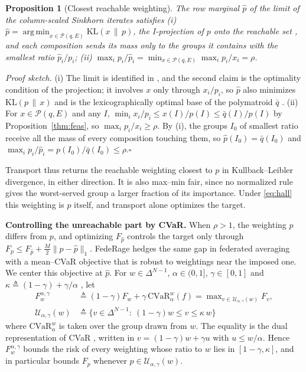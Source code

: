 \documentclass{article}
\newtheorem{proposition}[theorem]{Proposition}
\theoremstyle{definition}
\newcommand{\simplex}[1]{\Delta^{#1-1}}
\newcommand{\CVaR}{\mathrm{CVaR}}
\newcommand{\KL}{\mathrm{KL}}
\newcommand{\Reach}{\mathcal{P}(q,E)}
\newcommand{\Uset}{\mathcal{U}_{\alpha,\gamma}}
\DeclareMathOperator*{\argmin}{arg\,min}
\begin{document}
\vspace{-8pt}
\begin{proposition}[Closest reachable weighting]
\label{prop:proj}
The row marginal $\hat p$ of the limit of the column-scaled Sinkhorn
iterates satisfies
(i) $\hat p=\argmin_{x\in\Reach}\KL(x\,\|\,p)$, the I-projection of $p$
onto the reachable set \cite{csiszar1975}, and each composition sends its
mass only to the groups it contains with the smallest ratio $\hat p_i/p_i$;
(ii) $\max_ip_i/\hat p_i=\min_{x\in\Reach}\max_ip_i/x_i=\rho$.
\end{proposition}
\vspace{-8pt}
\noindent\emph{Proof sketch.} (i) The limit is identified in
\cite{gietl2013ipfp}, 
and the second claim is the optimality condition of the projection; it
involves $x$ only through $x_i/p_i$, so $\hat p$ also minimizes
$\KL(p\,\|\,x)$ and is the lexicographically optimal base of the
polymatroid $\bar q$ \cite{fujishige1980}. (ii) For $x\in\Reach$ and any
$I$, $\min_ix_i/p_i\le x(I)/p(I)\le\bar q(I)/p(I)$ by
Proposition~\ref{thm:feas}, so $\max_ip_i/x_i\ge\rho$. By (i), the groups
$I_0$ of smallest ratio receive all the mass of every composition
touching them, so $\hat p(I_0)=\bar q(I_0)$ and
$\max_ip_i/\hat p_i=p(I_0)/\bar q(I_0)\le\rho$.\hfill$\square$

Transport thus returns the reachable weighting closest to $p$ in
Kullback--Leibler divergence, in either direction. It is also max--min
fair, since no normalized rule gives the worst-served group a larger
fraction of its importance. Under \eqref{eq:hall} this weighting is $p$
itself, and transport alone optimizes the target.

\noindent\textbf{Controlling the unreachable part by CVaR.} When $\rho>1$,
the weighting $\hat p$ differs from $p$, and optimizing $F_{\hat p}$
controls the target only through
$F_p\le F_{\hat p}+\frac M2\|p-\hat p\|_1$. \textsf{FedeRage}
\cite{rahimi2026federage} hedges the same gap in federated averaging with
a mean--CVaR objective that is robust to weightings near the imposed one.
We center this objective at $\hat p$. For $w\in\simplex{N}$,
$\alpha\in(0,1]$, $\gamma\in[0,1]$ and
$\kappa\triangleq(1-\gamma)+\gamma/\alpha$ \cite{rahimi2026federage}, let
\vspace{-8pt}
\begin{equation}
\begin{aligned}
\label{eq:meancvar}
F^{\alpha,\gamma}_w&\triangleq(1-\gamma)F_w+\gamma\,\CVaR^w_\alpha(f)
=\max\nolimits_{v\in\,\Uset(w)}F_v,\\
\Uset(w)&\triangleq\big\{v\in\simplex{N}:\ (1-\gamma)w\le v\le\kappa\,w\big\}
\end{aligned}
\end{equation}
where $\CVaR^w_\alpha$ is taken over the group drawn from $w$. The
equality is the dual representation of CVaR \cite{shapiro2009lectures},
written in $v=(1-\gamma)w+\gamma u$ with $u\le w/\alpha$. Hence
$F^{\alpha,\gamma}_w$ bounds the risk of every weighting whose ratio to
$w$ lies in $[1-\gamma,\kappa]$, and in particular bounds $F_p$ whenever
$p\in\Uset(w)$.
\end{document}
